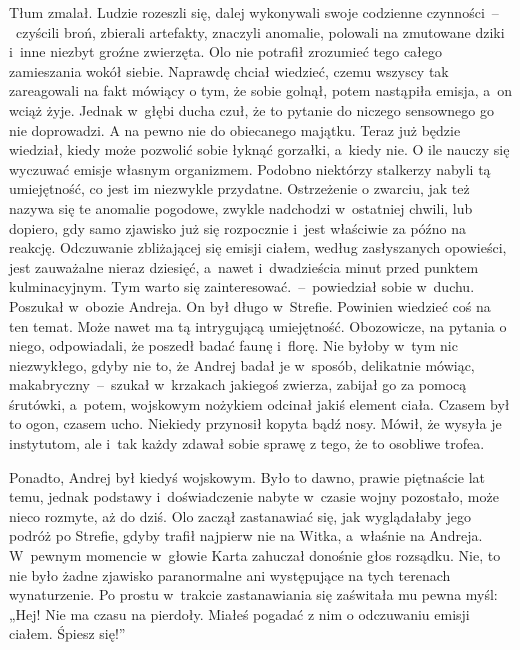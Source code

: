 \documentclass[../MAIN.tex]{subfiles}
\begin{document}
Tłum zmalał. Ludzie rozeszli się, dalej wykonywali swoje codzienne czynności~--~czyścili broń, zbierali artefakty, znaczyli anomalie, polowali na zmutowane dziki i~inne niezbyt groźne zwierzęta. Olo nie potrafił zrozumieć tego całego zamieszania wokół siebie. Naprawdę chciał wiedzieć, czemu wszyscy tak zareagowali na fakt mówiący o tym, że sobie golnął, potem nastąpiła emisja, a~on wciąż żyje. Jednak w~głębi ducha czuł, że to pytanie do niczego sensownego go nie doprowadzi. A na pewno nie do obiecanego majątku. Teraz już będzie wiedział, kiedy może pozwolić sobie łyknąć gorzałki, a~kiedy nie. O ile nauczy się wyczuwać emisje własnym organizmem. Podobno niektórzy stalkerzy nabyli tą umiejętność, co jest im niezwykle przydatne. Ostrzeżenie o zwarciu, jak też nazywa się te anomalie pogodowe, zwykle nadchodzi w~ostatniej chwili, lub dopiero, gdy samo zjawisko już się rozpocznie i~jest właściwie za późno na reakcję. Odczuwanie zbliżającej się emisji ciałem, według zasłyszanych opowieści, jest zauważalne nieraz
dziesięć, a~nawet i~dwadzieścia minut przed punktem kulminacyjnym.
\sd
\xx Tym warto się zainteresować.~--~powiedział sobie w~duchu.
\qm
Poszukał w~obozie Andreja. On był długo w~Strefie. Powinien wiedzieć coś na ten temat. Może nawet ma tą intrygującą umiejętność. Obozowicze, na pytania o niego, odpowiadali, że poszedł badać faunę i~florę. Nie byłoby w~tym nic niezwykłego, gdyby nie to, że Andrej badał je w~sposób, delikatnie mówiąc, makabryczny~--~szukał w~krzakach jakiegoś zwierza, zabijał go za pomocą śrutówki, a~potem, wojskowym nożykiem odcinał jakiś element ciała. Czasem był to ogon, czasem ucho. Niekiedy przynosił kopyta bądź nosy. Mówił, że wysyła je instytutom, ale i~tak każdy zdawał sobie sprawę z tego, że to osobliwe trofea.

Ponadto, Andrej był kiedyś wojskowym. Było to dawno, prawie piętnaście lat temu, jednak podstawy i~doświadczenie nabyte w~czasie wojny pozostało, może nieco rozmyte, aż do dziś. Olo zaczął zastanawiać się, jak wyglądałaby jego podróż po Strefie, gdyby trafił najpierw nie na Witka, a~właśnie na Andreja. W~pewnym momencie w~głowie Karta zahuczał donośnie głos rozsądku. Nie, to nie było żadne zjawisko paranormalne ani występujące na tych terenach wynaturzenie. Po prostu w~trakcie zastanawiania się zaświtała mu pewna myśl: „Hej! Nie ma czasu na pierdoły. Miałeś pogadać z nim o odczuwaniu emisji ciałem. Śpiesz się!”
\end{document}
